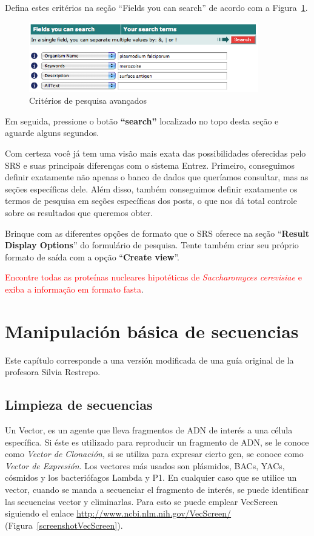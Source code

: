 \documentclass[letter,11pt]{book}
\begin{document}
Defina estes critérios na seção ``Fields you can search'' de acordo com a  Figura~\ref{busquedaplasmodium}.

\begin{figure}[ht]
\centering
   \includegraphics[width=10cm]{Figs/busquedaSRSplasmodium.png}
  \caption{\label{busquedaplasmodium}Critérios de pesquisa avançados}
\end{figure}

Em seguida, pressione o botão \textbf{``search''} localizado no topo desta seção e aguarde alguns segundos.

Com certeza você já tem uma visão mais exata das possibilidades oferecidas pelo SRS e suas principais diferenças com o sistema Entrez. Primeiro, conseguimos definir exatamente não apenas o banco de dados que queríamos consultar, mas as seções específicas dele. Além disso, também conseguimos definir exatamente os termos de pesquisa em seções específicas dos posts, o que nos dá total controle sobre os resultados que queremos obter. 

Brinque com as diferentes opções de formato que o SRS oferece na seção ``\textbf{Result Display Options}'' do formulário de pesquisa. Tente também criar seu próprio formato de saída com a opção ``\textbf{Create view}''. 

\textcolor{red}{Encontre todas as proteínas nucleares hipotéticas de \textit{Saccharomyces cerevisiae} e exiba a informação em formato fasta}. 

\chapter{Manipulación básica de secuencias}

Este capítulo corresponde a una versión modificada de una guía original de la profesora Silvia Restrepo.

\section{Limpieza de secuencias}

Un Vector, es un agente que lleva fragmentos de ADN de interés a una célula específica. Si éste es utilizado para reproducir un fragmento de ADN, se le conoce como \textit{Vector de Clonación}, si se utiliza para expresar cierto gen, se conoce como \textit{Vector de Expresión}. Los vectores más usados son plásmidos, BACs, YACs, cósmidos y los bacteriófagos Lambda y P1. En cualquier caso que se utilice un vector, cuando se manda a secuenciar el fragmento de interés, se puede identificar las secuencias vector y eliminarlas. Para esto se puede emplear VecScreen siguiendo el enlace \url{http://www.ncbi.nlm.nih.gov/VecScreen/} (Figura~\ref{screenshotVecScreen}).
\end{document}
